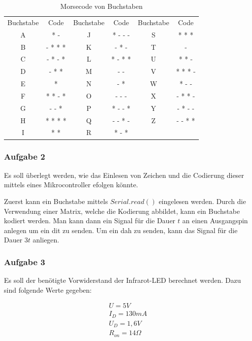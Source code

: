 \begin{table}[h]
    \centering
    \caption{Morsecode von Buchstaben}
    \label{tab:a7-morsecode}
    \begin{tabular}{| c | c | c | c | c | c |}
        \hline
        Buchstabe & Code & Buchstabe & Code & Buchstabe & Code \\
        A & * - & J & * - - - & S & * * * \\
        B & - * * * & K & - * - & T & - \\
        C & - * - * & L & * - * * & U & * * - \\
        D & - * * & M & - - & V & * * * - \\
        E & * & N & - * & W & * - - \\
        F & * * - * & O & - - - & X & - * * - \\
        G & - - * & P & * - - * & Y & - * - - \\
        H & * * * * & Q & - - * - & Z & - - * * \\
        I & * * & R & * - * & &  \\
        \hline
    \end{tabular}
\end{table}

\subsubsection{Aufgabe 2}

Es soll überlegt werden, wie das Einlesen von Zeichen und die Codierung dieser mittels eines Mikrocontroller efolgen könnte.

Zuerst kann ein Buchstabe mittels $Serial.read()$ eingelesen werden.
Durch die Verwendung einer Matrix, welche die Kodierung abbildet, kann ein Buchstabe kodiert werden.
Man kann dann ein Signal für die Dauer $t$ an einen Ausgangspin anlegen um ein dit zu senden.
Um ein dah zu senden, kann das Signal für die Dauer $3t$ anliegen.

\subsubsection{Aufgabe 3}

Es soll der benötigte Vorwiderstand der Infrarot-LED berechnet werden.
Dazu sind folgende Werte gegeben:

\begin{align}
    U = 5V \\
    I_D = 130mA \\
    U_D = 1,6V \\
    R_{on} = 14\Omega
\end{align}

